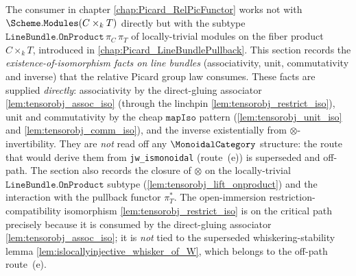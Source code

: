 The consumer in chapter \cref{chap:Picard_RelPicFunctor} works not with
\(\Scheme.\mathtt{Modules}(C \times_k T)\) directly but with the subtype
\(\texttt{LineBundle.OnProduct}\,\pi_C\,\pi_T\) of locally-trivial
modules on the fiber product \(C \times_k T\), introduced in
\cref{chap:Picard_LineBundlePullback}. This section records the
\emph{existence-of-isomorphism facts on line bundles} (associativity, unit,
commutativity and inverse) that the relative Picard group law consumes. These facts
are supplied \emph{directly}: associativity by the direct-gluing associator
\cref{lem:tensorobj_assoc_iso} (through the linchpin
\cref{lem:tensorobj_restrict_iso}), unit and commutativity by the cheap
\(\mathtt{mapIso}\) pattern (\cref{lem:tensorobj_unit_iso} and
\cref{lem:tensorobj_comm_iso}),
and the inverse existentially from \(\otimes\)-invertibility. They are \emph{not}
read off any \(\MonoidalCategory\) structure: the route that would derive them from
\texttt{jw\_ismonoidal} (route~(e)) is superseded and off-path. The section also
records the closure of \(\otimes\) on the locally-trivial
\(\texttt{LineBundle.OnProduct}\) subtype (\cref{lem:tensorobj_lift_onproduct}) and
the interaction with the pullback functor \(\pi_T^*\). The open-immersion
restriction-compatibility isomorphism \cref{lem:tensorobj_restrict_iso} is on the
critical path precisely because it is consumed by the direct-gluing associator
\cref{lem:tensorobj_assoc_iso}; it is \emph{not} tied to the superseded
whiskering-stability lemma \cref{lem:islocallyinjective_whisker_of_W}, which belongs
to the off-path route~(e).

